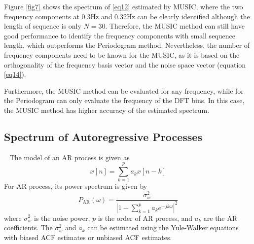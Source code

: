 \documentclass[10pt]{article}
\begin{document}
Figure \ref{fig7} shows the spectrum of \eqref{eq12} estimated by MUSIC, 
where the two frequency components at 0.3Hz and 0.32Hz can be 
clearly identified although the length of sequence is only $N=30$. 
Therefore, the MUSIC method can still have good performance to identify
the frequency components with small sequence length, which outperforms 
the Periodogram method. Nevertheless, the number of frequency components 
need to be known for the MUSIC, as it is based on the orthogonality of 
the frequency basis vector and the noise space vector (equation \eqref{eq14}). 

Furthermore, the MUSIC method can be evaluated for any frequency, 
while for the Periodogram can only evaluate the frequency of the 
DFT bins. In this case, the MUSIC method has higher accuracy of the 
estimated spectrum.

\subsection{Spectrum of Autoregressive Processes}
\ \indent
The model of an AR process is given as
\begin{equation}
	x[n] = \sum_{k=1}^p a_k x[n-k] \label{eq17}
\end{equation}
For AR process, its power spectrum is given by
\begin{equation}
	P_{\text{AR}}\left(\omega\right)=\frac{\sigma_w^2}{\left|1-\sum_{k=1}^{p}{a_ke^{-jk\omega}}\right|^2} \label{eq18}
\end{equation}
where $\sigma_w^2$ is the noise power, $p$ is the order of AR process, 
and $a_k$ are the AR coefficients. The $\sigma_w^2$ and $a_k$ can be estimated 
using the Yule-Walker equations with biased ACF estimates or unbiased ACF 
estimates.
\end{document}
